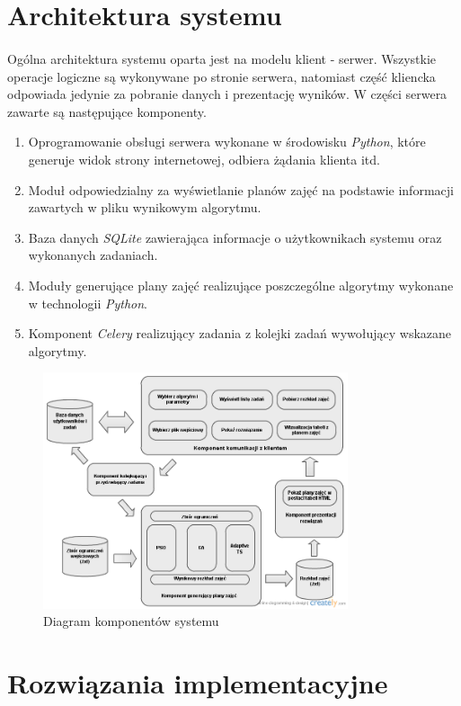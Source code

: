 \section{Architektura systemu}
\paragraph{} Ogólna architektura systemu oparta jest na modelu klient - serwer. Wszystkie operacje logiczne są wykonywane po stronie serwera, natomiast część kliencka odpowiada jedynie za pobranie danych i prezentację wyników. W części serwera zawarte są następujące komponenty.
\begin{enumerate}
\item Oprogramowanie obsługi serwera wykonane w środowisku \emph{Python}, które generuje widok strony internetowej, odbiera żądania klienta itd.
\item Moduł odpowiedzialny za wyświetlanie planów zajęć na podstawie informacji zawartych w pliku wynikowym algorytmu.
\item Baza danych \emph{SQLite} zawierająca informacje o użytkownikach systemu oraz wykonanych zadaniach.
\item Moduły generujące plany zajęć realizujące poszczególne algorytmy wykonane w technologii \emph{Python}.
\item Komponent \emph{Celery} realizujący zadania z kolejki zadań wywołujący wskazane algorytmy.
\end{enumerate}
\begin{figure}[H]
  \caption{Diagram komponentów systemu}
  \centering
    \includegraphics[width=0.8\textwidth]{img/ComponentsDiagram.png}
\end{figure}
\section{Rozwiązania implementacyjne}
